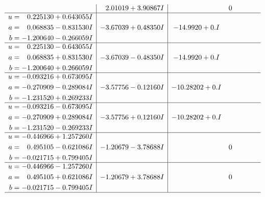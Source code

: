 \documentclass[1p]{elsarticle_modified}
\theoremstyle{definition}
\begin{document}
$$\begin{array}{c|c|c}
 & \phantom{-}2.01019 + 3.90867 I & \phantom{-0.000000 } 0 \\ \hline\begin{aligned}
u &= \phantom{-}0.225130 + 0.643055 I \\
a &= \phantom{-}0.068835 - 0.831530 I \\
b &= -1.200640 - 0.266059 I\end{aligned}
 & -3.67039 + 0.48350 I & -14.9920 + 0. I\phantom{ +0.000000I} \\ \hline\begin{aligned}
u &= \phantom{-}0.225130 - 0.643055 I \\
a &= \phantom{-}0.068835 + 0.831530 I \\
b &= -1.200640 + 0.266059 I\end{aligned}
 & -3.67039 - 0.48350 I & -14.9920 + 0. I\phantom{ +0.000000I} \\ \hline\begin{aligned}
u &= -0.093216 + 0.673095 I \\
a &= -0.270909 - 0.289084 I \\
b &= -1.231520 + 0.269233 I\end{aligned}
 & -3.57756 - 0.12160 I & -10.28202 + 0. I\phantom{ +0.000000I} \\ \hline\begin{aligned}
u &= -0.093216 - 0.673095 I \\
a &= -0.270909 + 0.289084 I \\
b &= -1.231520 - 0.269233 I\end{aligned}
 & -3.57756 + 0.12160 I & -10.28202 + 0. I\phantom{ +0.000000I} \\ \hline\begin{aligned}
u &= -0.446966 + 1.257260 I \\
a &= \phantom{-}0.495105 - 0.621086 I \\
b &= -0.021715 + 0.799405 I\end{aligned}
 & -1.20679 - 3.78688 I & \phantom{-0.000000 } 0 \\ \hline\begin{aligned}
u &= -0.446966 - 1.257260 I \\
a &= \phantom{-}0.495105 + 0.621086 I \\
b &= -0.021715 - 0.799405 I\end{aligned}
 & -1.20679 + 3.78688 I & \phantom{-0.000000 } 0\\
 \hline 
 \end{array}$$\newpage$$\begin{array}{c|c|c}  

\end{array}$$
\end{document}
